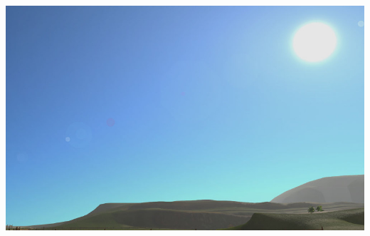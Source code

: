 \documentclass[a4paper,12pt,oneside]{sphinxmanual}
\begin{document}
{\hfill\includegraphics[width=1.000\linewidth]{skydome_procedural.jpg}\hfill}

\begin{DUlineblock}{0em}
\item[] 
\end{DUlineblock}
\end{document}
